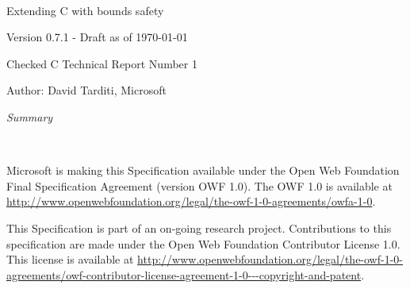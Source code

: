 \documentclass[11pt]{report}
\begin{document}
\begin{titlepage}
{\center
\mbox{ }\\
\vspace{2in}
{\huge Extending C with bounds safety \par}
{Version 0.7.1 - Draft as of \today \par}
\vspace{0.5in}
{Checked C Technical Report Number 1 \par}
\vspace{0.25in}
{Author: David Tarditi, Microsoft\par} 
\vspace{1in}
{\it Summary \par}

}
\end{titlepage}

\thispagestyle{empty}
\mbox{  }\\
\vspace{1.0in}

Microsoft is making this Specification available under the Open Web
Foundation Final Specification Agreement (version OWF 1.0).  The OWF 1.0
is available at {\color{blue} \url{http://www.openwebfoundation.org/legal/the-owf-1-0-agreements/owfa-1-0}}.

This Specification is part of an on-going research project.
Contributions to this specification
are made under the Open Web Foundation Contributor License 1.0. 
This license is available at {\color{blue} \url{http://www.openwebfoundation.org/legal/the-owf-1-0-agreements/owf-contributor-license-agreement-1-0---copyright-and-patent}}.

\newpage

\setcounter{page}{1}

\tableofcontents

\setcounter{page}{1}














\nocite{Jones2009}
\nocite{Jim2002}



\appendix
% 
% 
\end{document}
